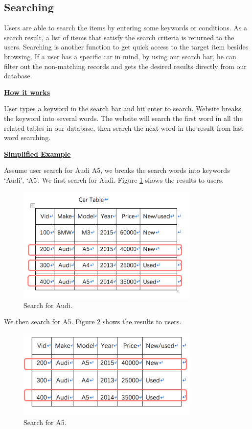 \documentclass[12pt]{article}
\begin{document}
\subsection{Searching}
Users are able to search the items by entering some keywords or conditions. As a search result, a list of items that satisfy the search criteria is returned to the users.
Searching is another function to get quick access to the target item besides browsing. If a user has a specific car in mind, by using our search bar, he can filter out the non-matching records and gets the desired results directly from our database.\par
\textbf{\underline{How it works}}\par
User types a keyword in the search bar and hit enter to search. Website breaks the keyword into several words. The website will search the first word in all the related tables in our database, then search the next word in the result from last word searching.\par
\textbf{\underline{Simplified Example}}\par
Assume user search for Audi A5, we breaks the search words into keywords `Audi', `A5'. We first search for Audi. Figure \ref{search_example_audi} shows the results to users.
\begin{figure}[!h]
\caption{Search for Audi.} \label{search_example_audi}
\begin{center}
\includegraphics[width=9cm]{search_example_audi}
\end{center}
\end{figure}
\par We then search for A5. Figure \ref{search_example_a5} shows the results to users.
\begin{figure}[!h]
\caption{Search for A5.} \label{search_example_a5}
\begin{center}
\includegraphics[width=9cm]{search_example_a5}
\end{center}
\end{figure}
\end{document}
